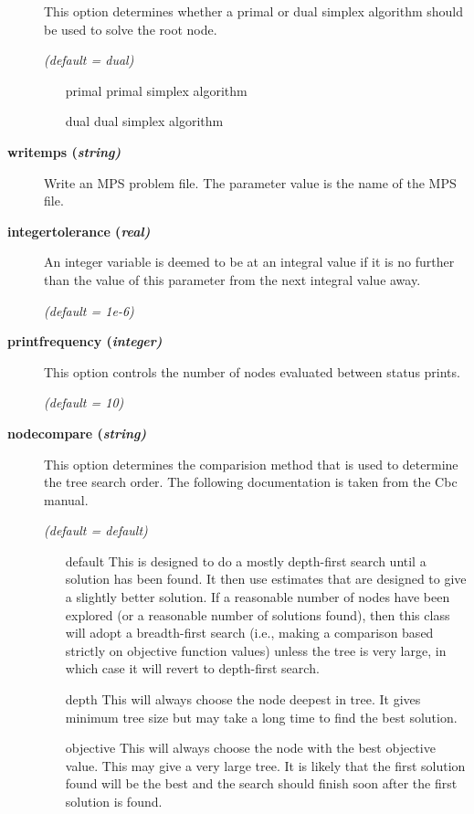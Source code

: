 \begin{description}
This option determines whether a primal or dual simplex algorithm should be used to solve the root node.

\textsl{(default = dual)}
\begin{itemize}
\item[primal] primal simplex algorithm
\item[dual] dual simplex algorithm
\end{itemize}

\item[\label{writemps}\hypertarget{writemps}
{\textbf{writemps (\slshape{string})}}]\hspace{1.0in}

Write an MPS problem file.
The parameter value is the name of the MPS file.


\item[\label{integertolerance}\hypertarget{integertolerance}
{\textbf{integertolerance (\slshape{real})}}]\hspace{1.0in}

An integer variable is deemed to be at an integral value if it is no further than the value of this parameter from the next integral value away.

\textsl{(default = 1e-6)}

\item[\label{printfrequency}\hypertarget{printfrequency}
{\textbf{printfrequency (\slshape{integer})}}]\hspace{1.0in}

This option controls the number of nodes evaluated between status prints.

\textsl{(default = 10)}

\item[\label{nodecompare}\hypertarget{nodecompare}
{\textbf{nodecompare (\slshape{string})}}]\hspace{1.0in}

This option determines the comparision method that is used to determine the tree search order.
The following documentation is taken from the Cbc manual.

\textsl{(default = default)}
\begin{itemize}
\item[default] 
This is designed to do a mostly depth-first search until a solution has been found.
It then use estimates that are designed to give a slightly better solution.
If a reasonable number of nodes have been explored (or a reasonable number of solutions found),
then this class will adopt a breadth-first search (i.e., making a comparison based strictly on objective function values) unless the tree is very large, in which case it will revert to depth-first search.
\item[depth] 
This will always choose the node deepest in tree.
It gives minimum tree size but may take a long time to find the best solution.
\item[objective] 
This will always choose the node with the best objective value.
This may give a very large tree.
It is likely that the first solution found will be the best and the search should finish soon after the first solution is found.
\end{itemize}


\end{description}
